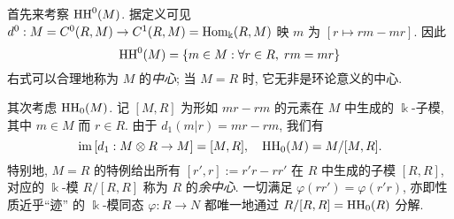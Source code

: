\begin{example}
	首先来考察 $\operatorname{HH}^0(M)$. 据定义可见 $d^0: M = C^0(R, M) \to C^1(R, M) = \operatorname{Hom}_{\Bbbk}(R, M)$ 映 $m$ 为 $[r \mapsto rm - mr]$. 因此
	\[ \operatorname{HH}^0(M) = \left\{ m \in M: \forall r \in R, \; rm=mr \right\} \]
	右式可以合理地称为 $M$ 的\emph{中心}; 当 $M = R$ 时, 它无非是环论意义的中心.
	
	其次考虑 $\operatorname{HH}_0(M)$. 记 $[M, R]$ 为形如 $mr-rm$ 的元素在 $M$ 中生成的 $\Bbbk$-子模, 其中 $m \in M$ 而 $r \in R$. 由于 $d_1(m|r) = mr - rm$, 我们有
	\[ \operatorname{im}\left[ d_1: M \otimes R \to M \right] = [M, R], \quad \operatorname{HH}_0(M) = M/[M, R]. \]
	特别地, $M=R$ 的特例给出所有 $[r', r] := r'r - rr'$ 在 $R$ 中生成的子模 $[R, R]$, 对应的 $\Bbbk$-模 $R/[R,R]$ 称为 $R$ 的\emph{余中心}. 一切满足 $\varphi(rr') = \varphi(r'r)$, 亦即性质近乎``迹'' 的 $\Bbbk$-模同态 $\varphi: R \to N$ 都唯一地通过 $R/[R, R] = \operatorname{HH}_0(R)$ 分解.
\end{example}


